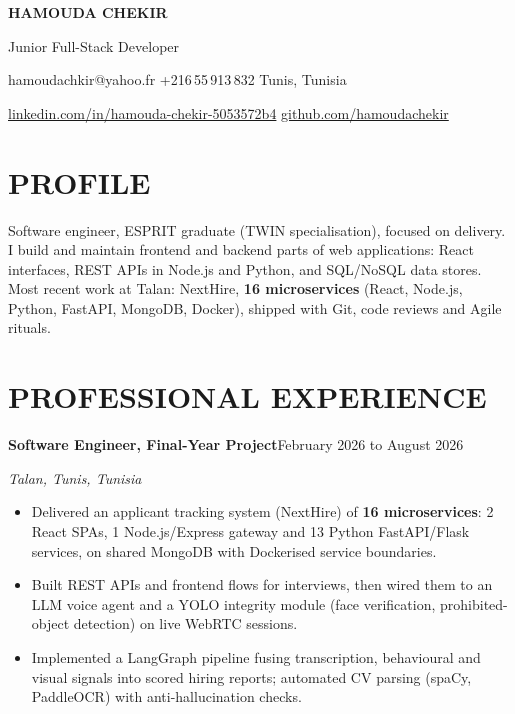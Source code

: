 \documentclass[10pt,a4paper]{article}
\newcommand{\TargetTitle}{Junior Full-Stack Developer}
\newcommand{\job}[3]{%
 \par\noindent\textbf{\color{primary}#1}\hfill{\color{muted}\small #2}\par\vspace{0.4pt}%
 {\noindent\color{accent}\textit{\small #3}}\par\vspace{1pt}%
 \begin{itemize}[leftmargin=0.85em, itemsep=0.8pt, topsep=0.4pt, parsep=0pt, partopsep=0pt]
}
\newcommand{\contactsep}{\hspace{5pt}{\color{rulecolor}|}\hspace{5pt}}
\begin{document}
{\fontsize{16}{18}\selectfont\bfseries\color{primary}HAMOUDA CHEKIR\par\vspace{1pt}}
{\large\color{accent}\TargetTitle\par\vspace{3pt}}
{\small\color{muted}%
 hamoudachkir@yahoo.fr
 \contactsep
 +216\,55\,913\,832
 \contactsep
 Tunis, Tunisia
\par\vspace{1pt}}
{\small\color{muted}%
 \href{https://www.linkedin.com/in/hamouda-chekir-5053572b4}{linkedin.com/in/hamouda-chekir-5053572b4}
 \contactsep
 \href{https://github.com/hamoudachekir}{github.com/hamoudachekir}
\par\vspace{4pt}}

\section{PROFILE}
{\small Software engineer, ESPRIT graduate (TWIN specialisation), focused on delivery. I build and maintain frontend and backend parts of web applications: React interfaces, REST APIs in Node.js and Python, and SQL/NoSQL data stores. Most recent work at Talan: NextHire, \textbf{16 microservices} (React, Node.js, Python, FastAPI, MongoDB, Docker), shipped with Git, code reviews and Agile rituals.}

\section{PROFESSIONAL EXPERIENCE}

\job{Software Engineer, Final-Year Project}{February 2026 to August 2026}{Talan, Tunis, Tunisia}
 \item Delivered an applicant tracking system (NextHire) of \textbf{16 microservices}: 2 React SPAs, 1 Node.js/Express gateway and 13 Python FastAPI/Flask services, on shared MongoDB with Dockerised service boundaries.
 \item Built REST APIs and frontend flows for interviews, then wired them to an LLM voice agent and a YOLO integrity module (face verification, prohibited-object detection) on live WebRTC sessions.
 \item Implemented a LangGraph pipeline fusing transcription, behavioural and visual signals into scored hiring reports; automated CV parsing (spaCy, PaddleOCR) with anti-hallucination checks.
\end{itemize}
\end{document}
